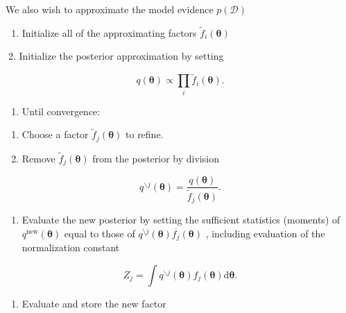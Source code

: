 \documentclass[
  10
]{article}
\providecommand{\tightlist}{%
  \setlength{\itemsep}{0pt}\setlength{\parskip}{0pt}}
\begin{document}
We also wish to approximate the model evidence \(p ( \mathcal { D } )\)

\begin{enumerate}
\def\labelenumi{\arabic{enumi}.}
\tightlist
\item
  Initialize all of the approximating factors
  \(\widetilde { f } _ { i } ( \pmb \theta )\)
\end{enumerate}

2. Initialize the posterior approximation by setting

\[
q (\boldsymbol {\theta}) \propto \prod_ {i} \widetilde {f} _ {i} (\boldsymbol {\theta}).\tag{10.204}
\]

\begin{enumerate}
\def\labelenumi{\arabic{enumi}.}
\setcounter{enumi}{2}
\tightlist
\item
  Until convergence:
\end{enumerate}

\begin{enumerate}
\def\labelenumi{(\alph{enumi})}
\item
  Choose a factor \(\widetilde { f } _ { j } ( \pmb { \theta } )\) to
  refine.
\item
  Remove \(\widetilde { f } _ { j } ( \pmb { \theta } )\) from the
  posterior by division
\end{enumerate}

\[
q ^ {\backslash j} (\boldsymbol {\theta}) = \frac {q (\boldsymbol {\theta})}{\widetilde {f} _ {j} (\boldsymbol {\theta})}.\tag{10.205}
\]

\begin{enumerate}
\def\labelenumi{(\alph{enumi})}
\setcounter{enumi}{2}
\tightlist
\item
  Evaluate the new posterior by setting the sufficient statistics
  (moments) of \(q ^ { \mathrm { n e w } } ( \pmb { \theta } )\) equal
  to those of
  \(q ^ { \setminus j } ( { \pmb \theta } ) { \overline { { f _ { j } } } } ( { \pmb \theta } )\)
  , including evaluation of the normalization constant
\end{enumerate}

\[
Z _ {j} = \int q ^ {\backslash j} (\boldsymbol {\theta}) f _ {j} (\boldsymbol {\theta}) \mathrm{d} \boldsymbol {\theta}.\tag{10.206}
\]

\begin{enumerate}
\def\labelenumi{(\alph{enumi})}
\setcounter{enumi}{3}
\tightlist
\item
  Evaluate and store the new factor
\end{enumerate}
\end{document}

